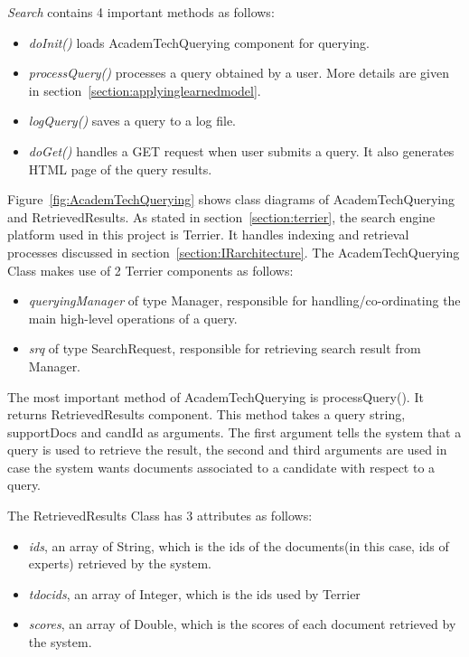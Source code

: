 \textit{Search} contains 4 important methods as follows: 
\begin{itemize}
 \item \textit{doInit()} loads AcademTechQuerying component for querying.
 \item \textit{processQuery()} processes a query obtained by a user. More details are given in section~\ref{section:applyinglearnedmodel}.
 \item \textit{logQuery()} saves a query to a log file.
 \item \textit{doGet()} handles a GET request when user submits a query. It also generates HTML page of the query results.
\end{itemize}

Figure~\ref{fig:AcademTechQuerying} shows class diagrams of AcademTechQuerying and RetrievedResults. As stated in section~\ref{section:terrier},
the search engine platform used in this project is Terrier. It handles indexing and retrieval processes discussed in section~\ref{section:IRarchitecture}.
The AcademTechQuerying Class makes use of 2 Terrier components as follows:  
\begin{itemize}
 \item \textit{queryingManager} of type Manager, responsible for handling/co-ordinating the main high-level operations of a query.
 \item \textit{srq} of type SearchRequest, responsible for retrieving search result from Manager.
\end{itemize}
The most important method of AcademTechQuerying is processQuery(). It returns RetrievedResults component. This method takes a query string, supportDocs and candId as arguments. The first argument tells
the system that a query is used to retrieve the result, the second and third arguments are used in case the system wants documents associated to a candidate 
with respect to a query.

The RetrievedResults Class has 3 attributes as follows:
\begin{itemize}
 \item \textit{ids}, an array of String, which is the ids of the documents(in this case, ids of experts) retrieved by the system.
 \item \textit{tdocids}, an array of Integer, which is the ids used by Terrier
 \item \textit{scores}, an array of Double, which is the scores of each document retrieved by the system.
\end{itemize}

